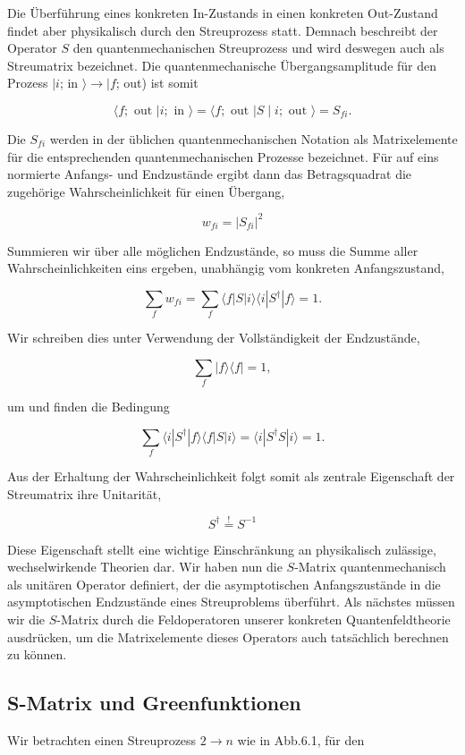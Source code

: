 \documentclass[10pt, letterpaper]{article}
\begin{document}
Die Überführung eines konkreten In-Zustands in einen konkreten Out-Zustand findet aber physikalisch durch den Streuprozess statt. Demnach beschreibt der Operator $S$ den quantenmechanischen Streuprozess und wird deswegen auch als Streumatrix bezeichnet. Die quantenmechanische Übergangsamplitude für den Prozess $\mid i$; in $\rangle \rightarrow \mid f$; out) ist somit

$$
\langle f ; \text { out }| i ; \text { in }\rangle=\langle f ; \text { out }| S \mid i ; \text { out }\rangle=S_{f i} .
$$

Die $S_{f i}$ werden in der üblichen quantenmechanischen Notation als Matrixelemente für die entsprechenden quantenmechanischen Prozesse bezeichnet. Für auf eins normierte Anfangs- und Endzustände ergibt dann das Betragsquadrat die zugehörige Wahrscheinlichkeit für einen Übergang,

$$
w_{f i}=\left|S_{f i}\right|^{2}
$$

Summieren wir über alle möglichen Endzustände, so muss die Summe aller Wahrscheinlichkeiten eins ergeben, unabhängig vom konkreten Anfangszustand,

$$
\sum_{f} w_{f i}=\sum_{f}\langle f| S|i\rangle\langle i| S^{\dagger}|f\rangle=1 .
$$

Wir schreiben dies unter Verwendung der Vollständigkeit der Endzustände,

$$
\sum_{f}|f\rangle\langle f|=1,
$$

um und finden die Bedingung

$$
\sum_{f}\langle i| S^{\dagger}|f\rangle\langle f| S|i\rangle=\langle i| S^{\dagger} S|i\rangle=1 .
$$

Aus der Erhaltung der Wahrscheinlichkeit folgt somit als zentrale Eigenschaft der Streumatrix ihre Unitarität,

$$
S^{\dagger} \stackrel{!}{=} S^{-1}
$$

Diese Eigenschaft stellt eine wichtige Einschränkung an physikalisch zulässige, wechselwirkende Theorien dar. Wir haben nun die $S$-Matrix quantenmechanisch als unitären Operator definiert, der die asymptotischen Anfangszustände in die asymptotischen Endzustände eines Streuproblems überführt. Als nächstes müssen wir die $S$-Matrix durch die Feldoperatoren unserer konkreten Quantenfeldtheorie ausdrücken, um die Matrixelemente dieses Operators auch tatsächlich berechnen zu können.

\subsection*{S-Matrix und Greenfunktionen}
Wir betrachten einen Streuprozess $2 \rightarrow n$ wie in Abb.6.1, für den
\end{document}
